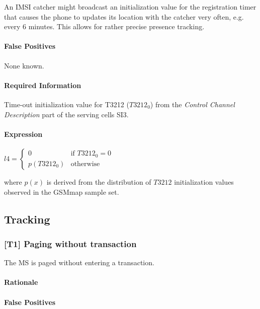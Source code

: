 \documentclass[a4paper,11pt,notitlepage,bigheadings,oneside]{scrartcl}
\begin{document}
An IMSI catcher might broadcast an initialization value for the registration
timer that causes the phone to updates its location with the catcher very
often, e.g. every 6 minutes. This allows for rather precise presence tracking.

\paragraph{False Positives}

None known.

\paragraph{Required Information}

Time-out initialization value for T3212 ($T3212_0$) from the \emph{Control
Channel Description} part of the serving cells SI3.

\paragraph{Expression}

$l4 =
\begin{cases}
	0 	 	& \text{if } T3212_0 = 0 \\
	p(T3212_0) 	& \text{otherwise}
\end{cases}$

where $p(x)$ is derived from the distribution of $T3212$ initialization values
observed in the GSMmap sample set. 

\subsection{Tracking}

\subsubsection{[T1] Paging without transaction}

The MS is paged without entering a transaction.

\paragraph{Rationale}

\TBD{}

\paragraph{False Positives}
\end{document}
